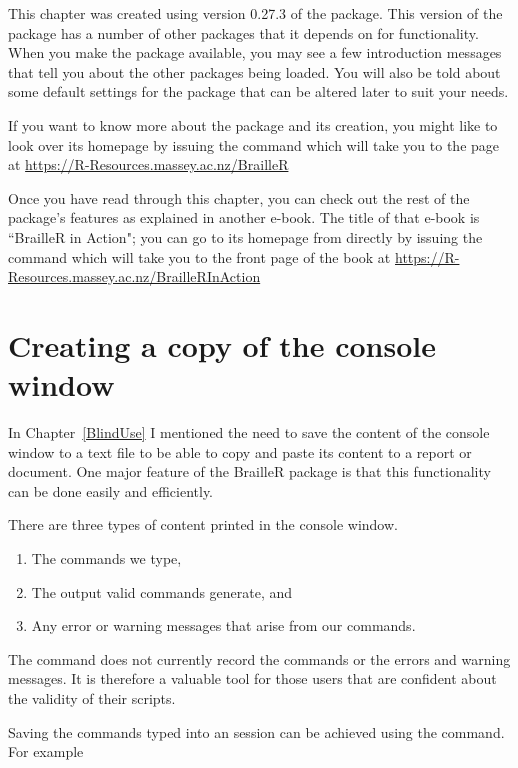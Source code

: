 This chapter was created using version 0.27.3 of the  package. This version of the package has a number of other packages that it depends on for functionality. When you make the  package available, you may see a few introduction messages that tell you about the other packages being loaded. You will also be told about some default settings for the package that can be altered later to suit your needs. 

If you want to know more about the  package and its creation, you might like to look over its homepage by issuing the  command which will take you to the page at
\url{https://R-Resources.massey.ac.nz/BrailleR}

Once you have read through this chapter, you can check out the rest of the  package's features as explained in another e-book. The title of that e-book is ``BrailleR in Action"; you can go to its homepage from \R{} directly by issuing the  command which will take you to the front page of the book at
\url{https://R-Resources.massey.ac.nz/BrailleRInAction}


 
 
\section{Creating a copy of the \R{} console window}\label{CreateCopyConsole} 
 
In Chapter~\ref{BlindUse} I mentioned the need to save the content of the console window to a text file to be able to copy and paste its content to a report or document. One major feature of the BrailleR package is that this functionality can be done easily and efficiently. 
 
There are three types of content printed in the console window.\begin{enumerate} 
\item The commands we type, 
\item The output valid commands generate, and 
\item Any error or warning messages that arise from our commands. 
\end{enumerate} 
 
The  command does not currently record the commands or the errors and warning messages. It is therefore a valuable tool for those \R{} users that are confident about the validity of their scripts. 
 
Saving the commands typed into an \R{} session can be achieved using the  command. For example 

